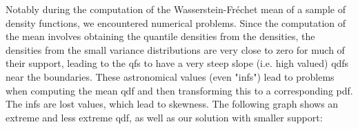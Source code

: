 Notably during the computation of the Wasserstein-Fréchet mean of a sample of density
functions, we encountered numerical problems. Since the computation of the mean involves
obtaining the quantile densities from the densities, the densities from the small
variance distributions are very close to zero for much of their support, leading to the
qfs to have a very steep slope (i.e. high valued) qdfs near the boundaries. These
astronomical values (even "infs") lead to problems when computing the mean qdf and then
transforming this to a corresponding pdf. The infs are lost values, which lead to skewness.
The following graph shows an extreme and less extreme qdf, as well as our solution with
smaller support: